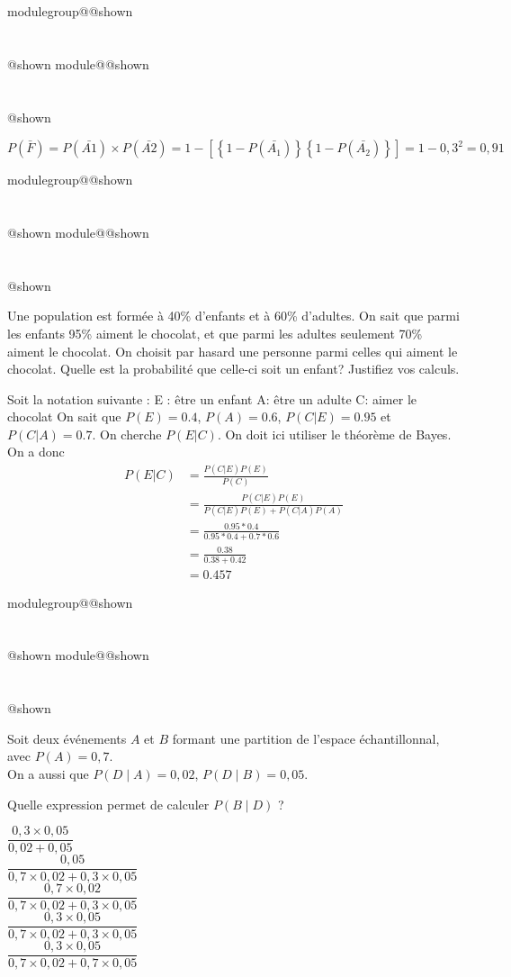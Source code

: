 \documentclass{Evaluation}
\makeatletter
\newcommand{\currentmodulekey}{}
\newcommand{\currentmoduletitle}{}
\newcommand{\currentgroupkey}{}
\newcommand{\currentgrouptitle}{}
\newcommand{\showmoduleifneeded}{%
  \ifx\currentgroupkey\empty\else
    \expandafter\ifx\csname modulegroup@\currentgroupkey @shown\endcsname\relax
      \section*{\currentgrouptitle}%
      \expandafter\gdef\csname modulegroup@\currentgroupkey @shown\endcsname{1}%
    \fi
  \fi
  \expandafter\ifx\csname module@\currentmodulekey @shown\endcsname\relax
    \section*{\currentmoduletitle}%
    \expandafter\gdef\csname module@\currentmodulekey @shown\endcsname{1}%
  \fi
}
\newenvironment{A22}{\showmoduleifneeded}{}
\newenvironment{H26}{\showmoduleifneeded}{}
\makeatother
\begin{document}
\begin{questions}
\begin{A22}
\begin{solution}
$P(\bar{F})= P(\bar{A1}) \times P(\bar{A2}) = 1 - \left[\left\{1-P\left(\bar{A_1}\right)\right\}\left\{1-P\left(\bar{A_2}\right)\right\}\right]=1-0,3^2=0,91$
\end{solution}
\end{A22}

\begin{A22}
\question {} %
Une population est formée à 40\% d'enfants et à 60\% d'adultes. On sait que parmi les enfants 95\% aiment le chocolat, et que parmi les adultes seulement 70\% aiment le chocolat. On choisit par hasard une personne parmi celles qui aiment le chocolat. Quelle est la probabilité que celle-ci soit un enfant? Justifiez vos calculs.
\begin{solution}
Soit la notation suivante : 
E : être un enfant
A: être un adulte
C: aimer le chocolat
On sait que $P(E)=0.4$, $P(A)=0.6$, $P(C|E)=0.95$ et $P(C|A)=0.7$.
On cherche $P(E|C)$.
On doit ici utiliser le théorème de Bayes. On a donc 
\begin{align}
    P(E|C) &= \frac{P(C|E)P(E)}{P(C)}\\
    &= \frac{P(C|E)P(E)}{P(C|E)P(E) + P(C|A)P(A)} \\
    &= \frac{0.95 * 0.4}{0.95 * 0.4 + 0.7*0.6}\\
    &= \frac{0.38}{0.38+0.42} \\
    &= 0.457
\end{align}
\end{solution}
\end{A22}

\begin{H26}
\question {} %
Soit deux événements $A$ et $B$ formant une partition de l'espace échantillonnal, avec $P(A)=0,7$. \\On a aussi que $P(D\mid A)=0,02$, $P(D\mid B)=0,05$.

Quelle expression permet de calculer $P(B\mid D)$ ?\\

\begin{checkboxes}
\choice $\dfrac{0,3\times 0,05}{0,02 + 0,05}$\\[4pt]
\choice $\dfrac{0,05}{0,7\times 0,02 + 0,3\times 0,05}$\\[4pt]
\choice $\dfrac{0,7\times 0,02}{0,7\times 0,02 + 0,3\times 0,05}$\\[4pt]
\correctchoice $\dfrac{0,3\times 0,05}{0,7\times 0,02 + 0,3\times 0,05}$\\[4pt]
\choice $\dfrac{0,3\times 0,05}{0,7\times 0,02 + 0,7\times 0,05}$
\end{checkboxes}
\end{H26}


\end{questions}
\end{document}
